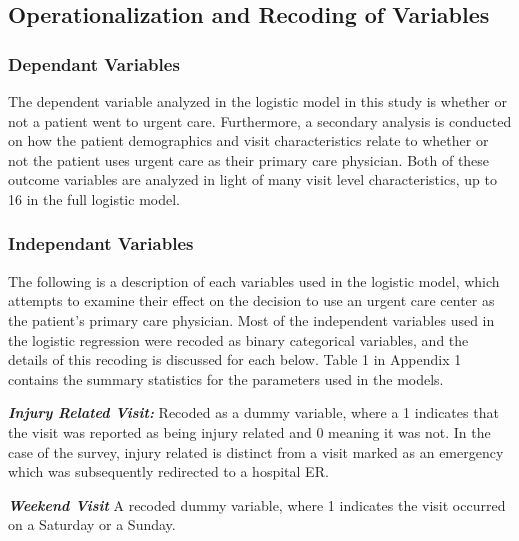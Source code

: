 \documentclass[12pt,twoside]{reedthesis}
\begin{document}
  \subsection*{Operationalization and Recoding of
  Variables}\label{operationalization-and-recoding-of-variables}
  
  \subsubsection*{Dependant Variables}\label{dependant-variables}
  
  The dependent variable analyzed in the logistic model in this study is
  whether or not a patient went to urgent care. Furthermore, a secondary
  analysis is conducted on how the patient demographics and visit
  characteristics relate to whether or not the patient uses urgent care as
  their primary care physician. Both of these outcome variables are
  analyzed in light of many visit level characteristics, up to 16 in the
  full logistic model.
  
  \subsubsection*{Independant Variables}\label{independant-variables}
  
  The following is a description of each variables used in the logistic
  model, which attempts to examine their effect on the decision to use an
  urgent care center as the patient's primary care physician. Most of the
  independent variables used in the logistic regression were recoded as
  binary categorical variables, and the details of this recoding is
  discussed for each below. Table 1 in Appendix 1 contains the summary
  statistics for the parameters used in the models.
  
  \textbf{\emph{Injury Related Visit:}} Recoded as a dummy variable, where
  a 1 indicates that the visit was reported as being injury related and 0
  meaning it was not. In the case of the survey, injury related is
  distinct from a visit marked as an emergency which was subsequently
  redirected to a hospital ER.
  
  \textbf{\emph{Weekend Visit}} A recoded dummy variable, where 1
  indicates the visit occurred on a Saturday or a Sunday.
  
\end{document}
